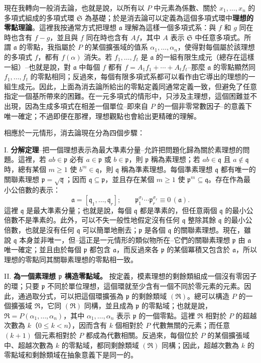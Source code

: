 \documentclass[11pt]{article}
\newcommand{\frakR}{\mathfrak R}
\newcommand{\frakS}{\mathfrak S}
\newcommand{\fraka}{\mathfrak a}
\newcommand{\frakp}{\mathfrak p}
\newcommand{\frakq}{\mathfrak q}
\newcommand{\srcemph}[1]{\textbf{#1}}
\begin{document}
現在我轉向一般消去論，也就是說，以所有以 $P$ 中元素為係數、關於 $x_1,\ldots,x_n$ 的多項式組成的多項式環 $\frakS$ 為基礎；於是消去論可以定義為這個多項式環中\srcemph{理想的零點理論}。這裡我按通常方式把理想 $\fraka$ 理解為這樣一個多項式系：與 $f$ 和 $g$ 同在時也含有 $f-g$，並且與 $f$ 同在時也含有 $Af$，其中 $A$ 表示 $\frakS$ 中任意多項式。所謂 $\fraka$ 的零點，我指屬於 $P$ 的某個擴張域的值系 $\alpha_1,\ldots,\alpha_n$，使得對每個屬於該理想的多項式 $f$，都有 $f(\alpha)$ 消失。若 $f_1,\ldots,f_t$ 是 $\fraka$ 的一組有限生成元（總存在這樣一組）--也就是說，對 $\fraka$ 中每個 $f$ 都有 $f=A_1f_1+\cdots+A_tf_t$--那麼 $\fraka$ 的零點顯然同 $f_1,\ldots,f_t$ 的零點相同；反過來，每個有限多項式系都可以看作由它導出的理想的一組生成元。因此，上面為消去論所給出的零點定義同通常定義一致，但避免了任意指定一個基所帶來的困難。在一元多項式的情形中，只涉及主理想，這個困難並不出現，因為生成多項式在相差一個單位--即來自 $P$ 的一個非零常數因子--的意義下唯一確定；不過即便在那裡，理想觀點也會給出更精確的理解。

相應於一元情形，消去論現在分為四個步驟：

\noindent I. \srcemph{分解定理}--把一個理想表示為最大準素分量--允許把問題化歸為關於素理想的問題。這裡，若 $ab\in\frakp$ 必有 $a\in\frakp$ 或 $b\in\frakp$，則 $\frakp$ 稱為素理想；若 $ab\in\frakq$ 且 $a\notin\frakq$ 時，總有某個 $m\geq 1$ 使 $b^m\in\frakq$，則 $\frakq$ 稱為準素理想。每個準素理想 $\frakq$ 都有唯一的關聯素理想 $\frakp=\sqrt{\frakq}$；因而 $\frakq\subseteq\frakp$，並且存在某個 $m\geq 1$ 使 $\frakp^m\subseteq\frakq$。存在作為最小公倍數的表示：
\[
 \fraka=[\frakq_1,\ldots,\frakq_r];\qquad
 \frakp_1^{\sigma_1}\cdots \frakp_r^{\sigma_r}\equiv 0\,(\fraka).
\]
這裡 $\frakq$ 是最大準素分量；也就是說，每個 $\frakq$ 都是準素的，但任意兩個 $\frakq$ 的最小公倍數不是準素的。此外，可以不失一般性地假定沒有任何 $\frakq$ 整除其餘 $\frakq$ 的最小公倍數，也就是沒有任何 $\frakq$ 可以簡單地刪去；$\frakp$ 是各個 $\frakq$ 的關聯素理想。現在，雖說 $\frakq$ 本身並非唯一，但--這正是一元情形的類似物所在--它們的關聯素理想 $\frakp$ 由 $\fraka$ 唯一確定；並且由於每個 $\frakp$ 都包含 $\fraka$，而反過來各 $\frakp$ 的某個冪積又包含於 $\fraka$，所以理想的零點同其關聯素理想的零點相一致。

\noindent II. \srcemph{為一個素理想 $\frakp$ 構造零點域。} 按定義，模素理想的剩餘類組成一個沒有零因子的環；只要 $\frakp$ 不同於單位理想，這個環就至少含有一個不同於零元素的元素。因此，通過取分式，可以把這個環擴張為 $\frakp$ 的剩餘類域 $(\frakR)$。總可以構造 $P$ 的一個擴張域 $\frakR$，它同 $(\frakR)$ 同構，並且成為 $\frakp$ 的零點域；也就是說，$\frakR=P(\alpha_1,\ldots,\alpha_n)$，其中 $\alpha_1,\ldots,\alpha_n$ 表示 $\frakp$ 的一個零點。這裡 $\frakR$ 相對於 $P$ 的超越次數為 $k$（$0\leq k<n$），因而含有 $k$ 個相對於 $P$ 代數無關的元素；而任意 $(k+1)$ 個元素相對於 $P$ 都成為代數相關。反過來，每個位於 $P$ 的某個擴張域中、超越次數為 $k$ 的零點域，都同剩餘類域 $(\frakR)$ 同構；因此，超越次數為 $k$ 的零點域和剩餘類域在抽象意義下是同一的。
\end{document}
